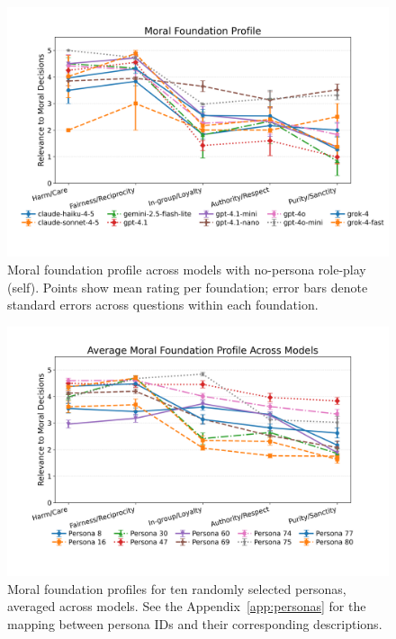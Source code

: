 \documentclass{article}
\begin{document}
\begin{figure}[t]
  \centering
  \includegraphics[width=\linewidth]{../results/moral_foundations_relevance_profiles.png}
  \caption{Moral foundation profile across models with no-persona role-play (self). Points show mean rating per foundation; error bars denote standard errors across questions within each foundation.}
  \label{fig:mfq-profiles}
\end{figure}

\begin{figure}[t]
  \centering
  \includegraphics[width=\linewidth]{../results/persona_moral_foundations_relevance_profiles.png}
  \caption{Moral foundation profiles for ten randomly selected personas, averaged across models. See the Appendix~\ref{app:personas} for the mapping between persona IDs and their corresponding descriptions.}
  \label{fig:persona-mfq-profiles}
\end{figure}
\end{document}
